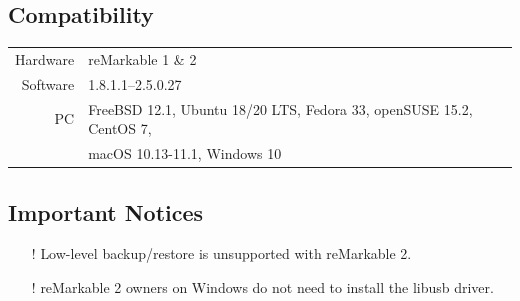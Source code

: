 \documentclass{memoir}
\begin{document}
{{\subsection{Compatibility}
\begin{tabular}{ r | l }
  Hardware & reMarkable 1 \& 2 \\
  Software & 1.8.1.1--2.5.0.27 \\
  PC & FreeBSD 12.1, Ubuntu 18/20 LTS, Fedora 33, openSUSE 15.2, CentOS 7, \\
  & macOS 10.13-11.1, Windows 10 \\
\end{tabular}

\subsection{Important Notices}
\begin{itemize}
\item[!]{Low-level backup/restore is unsupported with reMarkable 2.}
\item[!]{reMarkable 2 owners on Windows do not need to install the libusb driver.}
\end{itemize}

}}
\end{document}
